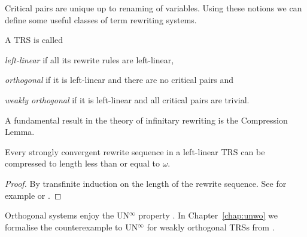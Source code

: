 Critical pairs are unique up to renaming of variables. Using these
notions we can define some useful classes of term rewriting systems.



\begin{definition}%
A TRS is called
\begin{compactenum}
  \item \emph{left-linear} if all its rewrite rules are left-linear,
  \item \emph{orthogonal} if it is left-linear and there are no critical pairs and
  \item \emph{weakly orthogonal} if it is left-linear and all critical pairs
    are trivial.
\end{compactenum}
\end{definition}

A fundamental result in the theory of infinitary rewriting is the
Compression Lemma.
\begin{lemma}\label{lem:compression}
  Every strongly convergent rewrite sequence in a left-linear TRS can
  be compressed to length less than or equal to $\omega$.
\end{lemma}
\begin{proof}
  By transfinite induction on the length of the rewrite sequence. See
  for example \citet[Theorem 12.7.1, page 689]{terese-03} or
  \citet{endrullis-10}.
\end{proof}

Orthogonal systems enjoy the UN$^\infty$ property
\citep{kennaway-95,klop-de-vrijer-05}. In Chapter~\ref{chap:unwo} we
formalise the counterexample to UN$^\infty$ for weakly orthogonal TRSs
from \citet{endrullis-10}.
